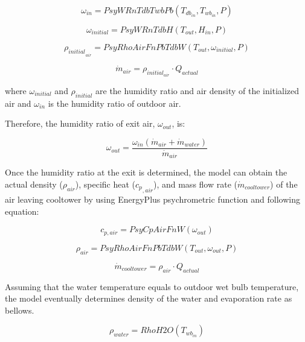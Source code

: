\begin{equation}
{\omega_{in}} = PsyWRnTdbTwbPb({T_{d{b_{in}}}},{T_{w{b_{in}}}},P)
\end{equation}

\begin{equation}
{\omega_{initial}} = PsyWRnTdbH({T_{out}},{H_{in}},P)
\end{equation}

\begin{equation}
{\rho_{initial}}_{_{air}} = PsyRhoAirFnPbTdbW({T_{out}},{\omega_{initial}},P)
\end{equation}

\begin{equation}
{\dot m_{air}} = {\rho_{initia{l_{air}}}} \cdot {Q_{actual}}
\end{equation}

where \({\omega_{initial}}\) and \({\rho_{initial}}\) are the humidity ratio and air density of the initialized air and \({\omega_{in}}\) is the humidity ratio of outdoor air.

Therefore, the humidity ratio of exit air, \({\omega_{out}}\), is:

\begin{equation}
{\omega_{out}} = \frac{{{\omega_{in}}({{\dot m}_{air}} + {{\dot m}_{water}})}}{{{{\dot m}_{air}}}}
\end{equation}

Once the humidity ratio at the exit is determined, the model can obtain the actual density (\({\rho_{air}}\)), specific heat (\({c_p}_{,air}\)), and mass flow rate (\({\dot m_{cooltower}}\)) of the air leaving cooltower by using EnergyPlus psychrometric function and following equation:

\begin{equation}
{c_{p,air}} = PsyCpAirFnW({\omega_{out}})
\end{equation}

\begin{equation}
{\rho_{air}} = PsyRhoAirFnPbTdbW({T_{out}},{\omega_{out}},P)
\end{equation}

\begin{equation}
{\dot m_{cooltower}} = {\rho_{air}} \cdot {Q_{actual}}
\end{equation}

Assuming that the water temperature equals to outdoor wet bulb temperature, the model eventually determines density of the water and evaporation rate as bellows.

\begin{equation}
{\rho_{water}} = RhoH2O({T_{w{b_{in}}}})
\end{equation}

